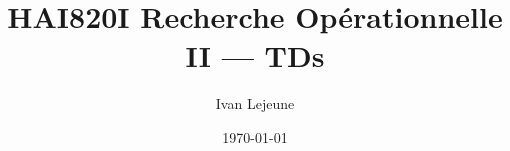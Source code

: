 








\title{\color{astral} \sffamily \bfseries HAI820I Recherche Opérationnelle II --- TDs}
\author{Ivan Lejeune}
\date{\today}

\toggletrue{showsolutions} %


    \maketitle
    \tableofcontents

    \newpage
    \setcounter{tdcounter}{0}
    
    \newpage
    
    \newpage
    
    \newpage
    
    \newpage
    
    



